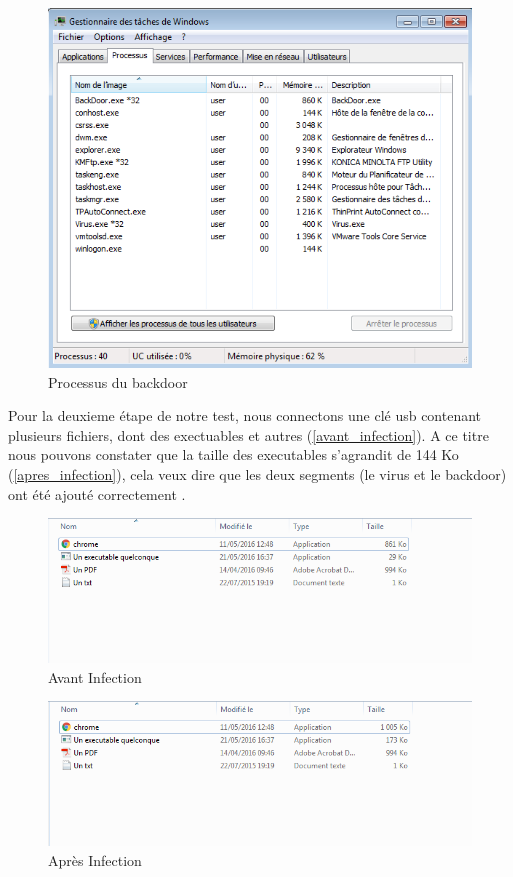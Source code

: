 \begin{figure}[H]
    \centering
    \includegraphics[width=\linewidth]{images/processus_backdoor.png}
    \caption{Processus du backdoor}
    \label{process_backdoor}
\end{figure}

Pour la deuxieme étape de notre test, nous connectons une clé usb contenant plusieurs fichiers, dont des exectuables et autres (\autoref{avant_infection}). A ce titre nous pouvons constater que la taille des executables s'agrandit de 144 Ko (\autoref{apres_infection}), cela veux dire que les deux segments (le virus et le backdoor) ont été ajouté correctement .

\begin{figure}[H]
    \centering
    \includegraphics[width=\linewidth]{images/avant_infeciton.png}
    \caption{Avant Infection}
    \label{avant_infection}
\end{figure}

\begin{figure}[H]
    \centering
    \includegraphics[width=\linewidth]{images/apres_infection.png}
    \caption{Après Infection}
    \label{apres_infection}
\end{figure}

